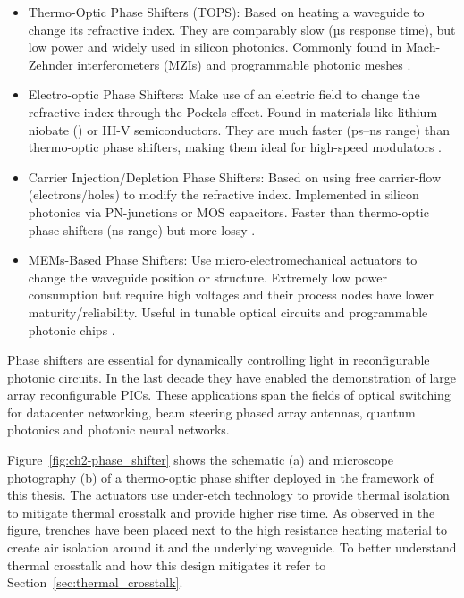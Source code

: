 \begin{itemize}
	\item Thermo-Optic Phase Shifters (TOPS): Based on heating a waveguide to change its refractive index.
	      They are comparably slow (µs response time), but low power and widely used in silicon photonics.
	      Commonly found in Mach-Zehnder interferometers (MZIs) and programmable photonic meshes \cite{jacques_optimization_2019, liu_thermo-optic_2022}.
	\item Electro-optic Phase Shifters: Make use of an electric field to change the refractive index through the Pockels effect.
	      Found in materials like lithium niobate () or III-V semiconductors.
	      They are much faster (ps–ns range) than thermo-optic phase shifters, making them ideal for high-speed modulators \cite{maldonado_electro-optic_1995,yoshioka_cmos-compatible_2024}.
	\item Carrier Injection/Depletion Phase Shifters: Based on using free carrier-flow (electrons/holes) to modify the refractive index.
	      Implemented in silicon photonics via PN-junctions or MOS capacitors.
	      Faster than thermo-optic phase shifters (ns range) but more lossy \cite{gabriel_performance_2020,kruckel_towards_2021}.
	\item MEMs-Based Phase Shifters: Use micro-electromechanical actuators to change the waveguide position or structure.
	      Extremely low power consumption but require high voltages and their process nodes have lower maturity/reliability.
	      Useful in tunable optical circuits and programmable photonic chips \cite{errando-herranz_mems_2020,quack_integrated_2023}.
\end{itemize}

Phase shifters are essential for dynamically controlling light in reconfigurable photonic circuits.
In the last decade they have enabled the demonstration of large array reconfigurable PICs.
These applications span the fields of optical switching for datacenter networking, beam steering phased array antennas, quantum photonics and photonic neural networks.

Figure~\ref{fig:ch2-phase_shifter} shows the schematic (a) and microscope photography (b) of a thermo-optic phase shifter deployed in the framework of this thesis.
The actuators use under-etch technology to provide thermal isolation to mitigate thermal crosstalk and provide higher rise time.
As observed in the figure, trenches have been placed next to the high resistance heating material to create air isolation around it and the underlying waveguide.
To better understand thermal crosstalk and how this design mitigates it refer to Section~\ref{sec:thermal_crosstalk}.

